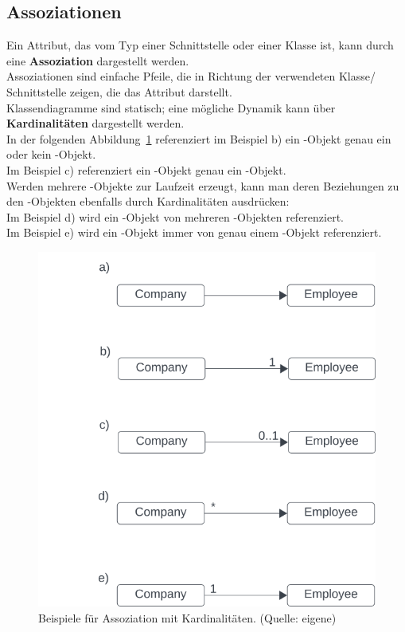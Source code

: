 \subsection{Assoziationen}

Ein Attribut, das vom Typ einer Schnittstelle oder einer Klasse ist, kann durch eine \textbf{Assoziation} dargestellt werden.\\

\noindent
Assoziationen sind einfache Pfeile, die in Richtung der verwendeten Klasse/ Schnittstelle zeigen, die das Attribut darstellt.\\

\noindent
Klassendiagramme sind statisch; eine mögliche Dynamik kann über \textbf{Kardinalitäten} dargestellt werden.\\
In der folgenden Abbildung~\ref{fig:association} referenziert im Beispiel b) ein -Objekt genau ein oder kein -Objekt.\\
Im Beispiel c) referenziert ein -Objekt genau ein -Objekt.\\

\noindent
Werden mehrere -Objekte zur Laufzeit erzeugt, kann man deren Beziehungen zu den -Objekten ebenfalls durch Kardinalitäten ausdrücken:\\
\noindent
Im Beispiel d) wird ein -Objekt von mehreren -Objekten referenziert.\\
\noindent
Im Beispiel e) wird ein -Objekt immer von genau einem -Objekt referenziert.

\begin{figure}
    \centering
    \includegraphics[scale=0.5]{chapters/fopt3/img/association}
    \caption{Beispiele für Assoziation mit Kardinalitäten. (Quelle: eigene)}
    \label{fig:association}
\end{figure}

